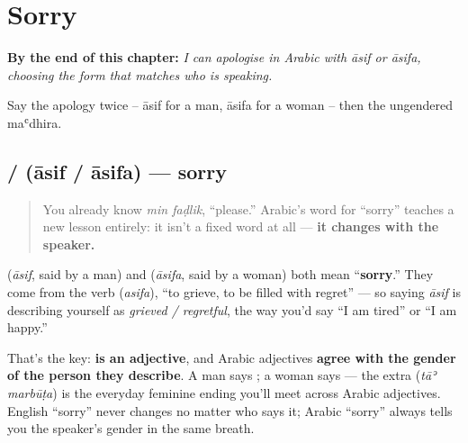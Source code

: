
\chapter{Sorry}
\label{ch:ar-sorry}

\begin{chapteropening}
\textbf{By the end of this chapter:} \emph{I can apologise in Arabic with āsif or āsifa, choosing the form that matches who is speaking.}

Say the apology twice -- āsif for a man, āsifa for a woman -- then the ungendered maʿdhira.
\end{chapteropening}

\section[\texorpdfstring{\ar{آسف} / \ar{آسفة} (āsif / āsifa)}{آسف / آسفة (āsif / āsifa)}]{ /  (āsif / āsifa) — sorry}

\label{lesson:AR-C07-asif}



\begin{quote}
You already know \emph{min faḍlik}, \textquotedblleft{}please.\textquotedblright{} Arabic's word for \textquotedblleft{}sorry\textquotedblright{} teaches a new lesson entirely: it isn't a fixed word at all — \textbf{it changes with the speaker.}
\end{quote}

\begin{cousinweb}
\textbf{} (\emph{āsif}, said by a man) and \textbf{} (\emph{āsifa}, said by a woman) both mean \textquotedblleft{}\textbf{sorry}.\textquotedblright{} They come from the verb \textbf{} (\emph{asifa}), \textquotedblleft{}to grieve, to be filled with regret\textquotedblright{} — so saying \emph{āsif} is describing yourself as \emph{grieved / regretful}, the way you'd say \textquotedblleft{}I am tired\textquotedblright{} or \textquotedblleft{}I am happy.\textquotedblright{}

That's the key: \textbf{ is an adjective}, and Arabic adjectives \textbf{agree with the gender of the person they describe}. A man says \textbf{}; a woman says \textbf{} — the extra \textbf{} (\emph{tāʾ marbūṭa}) is the everyday feminine ending you'll meet across Arabic adjectives. English \textquotedblleft{}sorry\textquotedblright{} never changes no matter who says it; Arabic \textquotedblleft{}sorry\textquotedblright{} always tells you the speaker's gender in the same breath.
\end{cousinweb}

